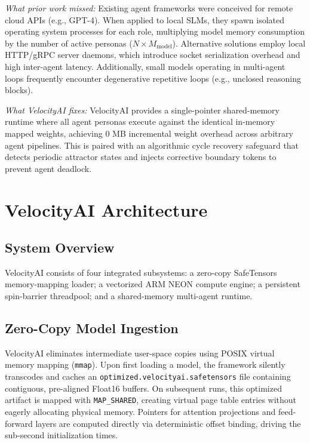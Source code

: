 \documentclass[a4paper,twocolumn,10pt]{article}
\begin{document}
\textit{What prior work missed:} Existing agent frameworks were conceived for remote cloud APIs (e.g., GPT-4). When applied to local SLMs, they spawn isolated operating system processes for each role, multiplying model memory consumption by the number of active personas ($N \times M_{\text{model}}$). Alternative solutions employ local HTTP/gRPC server daemons, which introduce socket serialization overhead and high inter-agent latency. Additionally, small models operating in multi-agent loops frequently encounter degenerative repetitive loops (e.g., unclosed reasoning blocks).

\textit{What VelocityAI fixes:} VelocityAI provides a single-pointer shared-memory runtime where all agent personas execute against the identical in-memory mapped weights, achieving 0 MB incremental weight overhead across arbitrary agent pipelines. This is paired with an algorithmic cycle recovery safeguard that detects periodic attractor states and injects corrective boundary tokens to prevent agent deadlock.

\section{VelocityAI Architecture}

\subsection{System Overview}
VelocityAI consists of four integrated subsystems: a zero-copy SafeTensors memory-mapping loader; a vectorized ARM NEON compute engine; a persistent spin-barrier threadpool; and a shared-memory multi-agent runtime.

\subsection{Zero-Copy Model Ingestion}
VelocityAI eliminates intermediate user-space copies using POSIX virtual memory mapping (\texttt{mmap}). Upon first loading a model, the framework silently transcodes and caches an \texttt{optimized.velocityai.safetensors} file containing contiguous, pre-aligned Float16 buffers. On subsequent runs, this optimized artifact is mapped with \texttt{MAP\_SHARED}, creating virtual page table entries without eagerly allocating physical memory. Pointers for attention projections and feed-forward layers are computed directly via deterministic offset binding, driving the sub-second initialization times.
\end{document}
